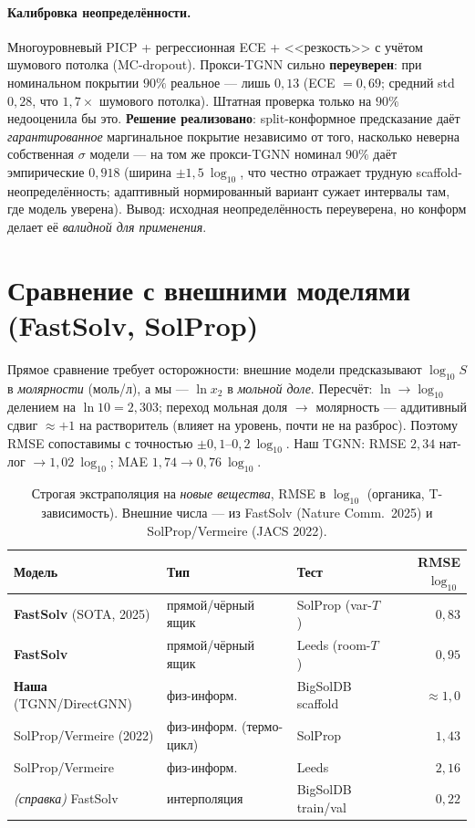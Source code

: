 \documentclass[11pt]{article}
\theoremstyle{plain}
\theoremstyle{definition}
\newcommand{\lnx}{\ln x_2}
\begin{document}
\paragraph{Калибровка неопределённости.} Многоуровневый PICP + регрессионная ECE
+ <<резкость>> с учётом шумового потолка (MC-dropout). Прокси-TGNN сильно
\textbf{переуверен}: при номинальном покрытии $90\%$ реальное --- лишь $0{,}13$
(ECE $=0{,}69$; средний std $0{,}28$, что $1{,}7\times$ шумового потолка). Штатная
проверка только на $90\%$ недооценила бы это. \textbf{Решение реализовано}:
split-конформное предсказание даёт \emph{гарантированное} маргинальное покрытие
независимо от того, насколько неверна собственная $\sigma$ модели --- на том же
прокси-TGNN номинал $90\%$ даёт эмпирические $0{,}918$ (ширина $\pm1{,}5\
\log_{10}$, что честно отражает трудную scaffold-неопределённость; адаптивный
нормированный вариант сужает интервалы там, где модель уверена). Вывод:
исходная неопределённость переуверена, но конформ делает её \emph{валидной для
применения}.

\section{Сравнение с внешними моделями (FastSolv, SolProp)}
\label{sec:external}
Прямое сравнение требует осторожности: внешние модели предсказывают $\log_{10}S$
в \emph{молярности} (моль/л), а мы --- $\lnx$ в \emph{мольной доле}. Пересчёт:
$\ln\to\log_{10}$ делением на $\ln 10=2{,}303$; переход мольная доля
$\to$ молярность --- аддитивный сдвиг $\approx{+}1$ на растворитель (влияет на
уровень, почти не на разброс). Поэтому RMSE сопоставимы с точностью
$\pm0{,}1$--$0{,}2\ \log_{10}$. Наш TGNN: RMSE $2{,}34$ нат-лог
$\to 1{,}02\ \log_{10}$; MAE $1{,}74\to 0{,}76\ \log_{10}$.

\begin{table}[h]
\centering
\caption{Строгая экстраполяция на \emph{новые вещества}, RMSE в $\log_{10}$
(органика, T-зависимость). Внешние числа --- из FastSolv (Nature Comm.\ 2025)
и SolProp/Vermeire (JACS 2022).}
\begin{tabular}{lll r}
\toprule
Модель & Тип & Тест & RMSE $\log_{10}$ \\
\midrule
\textbf{FastSolv} (SOTA, 2025) & прямой/чёрный ящик & SolProp (var-$T$) & $0{,}83$ \\
\textbf{FastSolv} & прямой/чёрный ящик & Leeds (room-$T$) & $0{,}95$ \\
\textbf{Наша} (TGNN/DirectGNN) & физ-информ. & BigSolDB scaffold & $\approx 1{,}0$ \\
SolProp/Vermeire (2022) & физ-информ. (термо-цикл) & SolProp & $1{,}43$ \\
SolProp/Vermeire & физ-информ. & Leeds & $2{,}16$ \\
\midrule
\textit{(справка)} FastSolv & интерполяция & BigSolDB train/val & $0{,}22$ \\
\bottomrule
\end{tabular}
\end{table}
\end{document}
